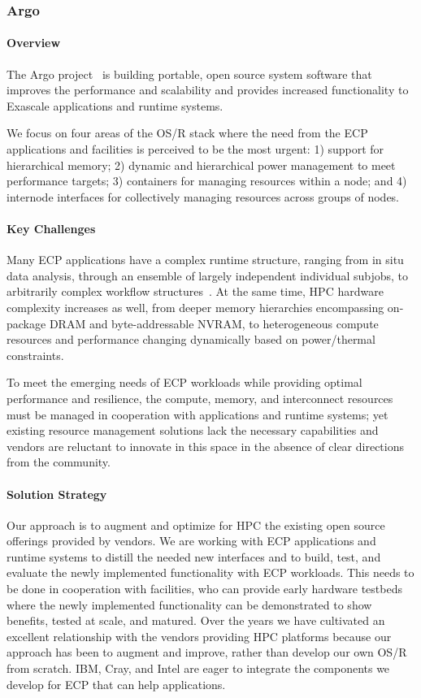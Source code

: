 \subsubsection{Argo} 

\paragraph{Overview} 

The Argo project~\cite{perarnau2017argo} is building portable, open source system software that improves
the performance and scalability and provides increased functionality to
Exascale applications and runtime systems.

We focus on four areas of the OS/R stack where the need from the ECP
applications and facilities is perceived to be the most urgent:
1) support for hierarchical memory;
2) dynamic and hierarchical power management to meet performance
targets;
3) containers for managing resources within a node; and
4) internode interfaces for collectively managing resources across groups
of nodes.


\paragraph{Key Challenges}

Many ECP applications have a complex runtime structure, ranging from in
situ data analysis, through an ensemble of largely independent individual
subjobs, to arbitrarily complex workflow structures~\cite{dreher2017situ}.  At the same time, HPC
hardware complexity increases as well, from deeper memory hierarchies
encompassing on-package DRAM and byte-addressable NVRAM, to heterogeneous
compute resources and performance changing dynamically based on
power/thermal constraints.

To meet the emerging needs of ECP workloads while providing optimal
performance and resilience, the compute, memory, and interconnect resources
must be managed in cooperation with applications and runtime systems; yet
existing resource management solutions lack the necessary capabilities and
vendors are reluctant to innovate in this space in the absence of clear
directions from the community.


\paragraph{Solution Strategy}

Our approach is to augment and optimize for HPC the existing open source
offerings provided by vendors. We are working with ECP applications and
runtime systems to distill the needed new interfaces and to build, test,
and evaluate the newly implemented functionality with ECP workloads.  This
needs to be done in cooperation with facilities, who can provide early
hardware testbeds where the newly implemented functionality can be
demonstrated to show benefits, tested at scale, and matured.  Over the
years we have cultivated an excellent relationship with the vendors
providing HPC platforms because our approach has been to augment and
improve, rather than develop our own OS/R from scratch.  IBM, Cray, and
Intel are eager to integrate the components we develop for ECP that can
help applications.

